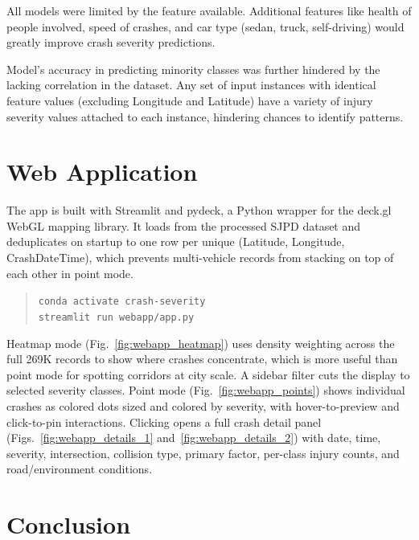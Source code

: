 \documentclass[conference]{IEEEtran}
\begin{document}
All models were limited by the feature available. Additional features like health of people involved, speed of crashes, and car type (sedan, truck, self-driving) would greatly improve crash severity predictions.

Model's accuracy in predicting minority classes was further hindered by the lacking correlation in the dataset. Any set of input instances with identical feature values (excluding Longitude and Latitude) have a variety of injury severity values attached to each instance, hindering chances to identify patterns.

\section{Web Application}

The app is built with Streamlit and pydeck, a Python wrapper for the deck.gl WebGL mapping library. It loads from the processed SJPD dataset and deduplicates on startup to one row per unique (Latitude, Longitude, CrashDateTime), which prevents multi-vehicle records from stacking on top of each other in point mode.

\begin{quote}
\texttt{conda activate crash-severity} \\
\texttt{streamlit run webapp/app.py}
\end{quote}

Heatmap mode (Fig.~\ref{fig:webapp_heatmap}) uses density weighting across the full 269K records to show where crashes concentrate, which is more useful than point mode for spotting corridors at city scale. A sidebar filter cuts the display to selected severity classes. Point mode (Fig.~\ref{fig:webapp_points}) shows individual crashes as colored dots sized and colored by severity, with hover-to-preview and click-to-pin interactions. Clicking opens a full crash detail panel (Figs.~\ref{fig:webapp_details_1} and~\ref{fig:webapp_details_2}) with date, time, severity, intersection, collision type, primary factor, per-class injury counts, and road/environment conditions.

\section{Conclusion}
\end{document}
